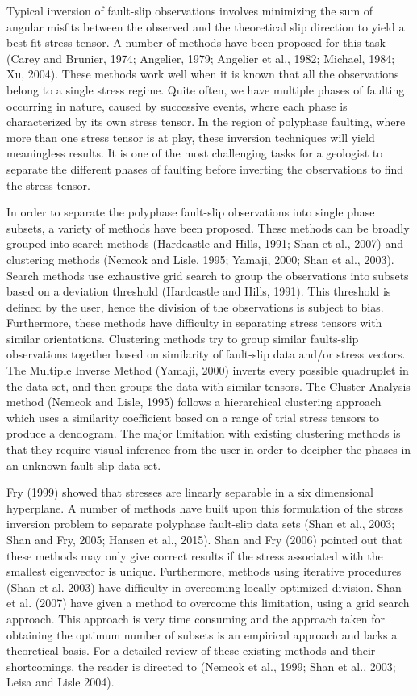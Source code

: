 \onehalfspacing
Typical inversion of fault-slip observations involves minimizing the sum of angular misfits between the observed and the theoretical slip direction to yield a best fit stress tensor. A number of methods have been proposed for this task (Carey and Brunier, 1974; Angelier, 1979; Angelier et al., 1982; Michael, 1984; Xu, 2004). These methods work well when it is known that all the observations belong to a single stress regime. Quite often, we have multiple phases of faulting occurring in nature, caused by successive events, where each phase is characterized by its own stress tensor. In the region of polyphase faulting, where more than one stress tensor is at play, these inversion techniques will yield meaningless results. It is one of the most challenging tasks for a geologist to separate the different phases of faulting before inverting the observations to find the stress tensor. 

In order to separate the polyphase fault-slip observations into single phase subsets, a variety of methods have been proposed. These methods can be broadly grouped into search methods (Hardcastle and Hills, 1991; Shan et al., 2007) and clustering methods (Nemcok and Lisle, 1995; Yamaji, 2000; Shan et al., 2003). Search methods use exhaustive grid search to group the observations into subsets based on a deviation threshold (Hardcastle and Hills, 1991). This threshold is defined by the user, hence the division of the observations is subject to bias. Furthermore, these methods have difficulty in separating stress tensors with similar orientations. Clustering methods try to group similar faults-slip observations together based on similarity of fault-slip data and/or stress vectors. The Multiple Inverse Method (Yamaji, 2000) inverts every possible quadruplet in the data set, and then groups the data with similar tensors. The Cluster Analysis method (Nemcok and Lisle, 1995) follows a hierarchical clustering approach which uses a similarity coefficient based on a range of trial stress tensors to produce a dendogram. The major limitation with existing clustering methods is that they require visual inference from the user in order to decipher the phases in an unknown fault-slip data set.

Fry (1999) showed that stresses are linearly separable in a six dimensional hyperplane. A number of methods have built upon this formulation of the stress inversion problem to separate polyphase fault-slip data sets (Shan et al., 2003; Shan and Fry, 2005; Hansen et al., 2015). Shan and Fry (2006) pointed out that these methods may only give correct results if the stress associated with the smallest eigenvector is unique. Furthermore, methods using iterative procedures (Shan et al. 2003) have difficulty in overcoming locally optimized division. Shan et al. (2007) have given a method to overcome this limitation, using a grid search approach. This approach is very time consuming and the approach taken for obtaining the optimum number of subsets is an empirical approach and lacks a theoretical basis. For a detailed review of these existing methods and their shortcomings, the reader is directed to (Nemcok et al., 1999; Shan et al., 2003; Leisa and Lisle 2004).

